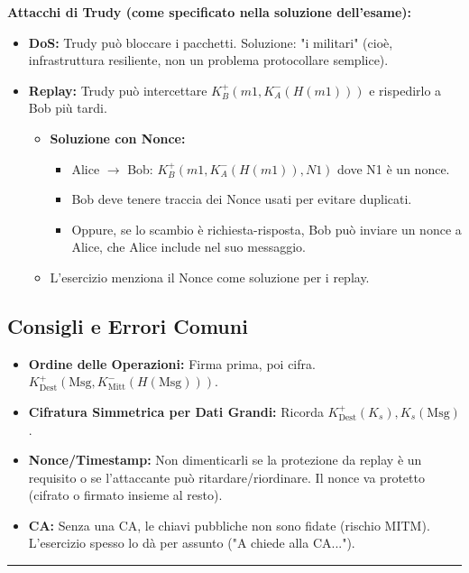 \textbf{Attacchi di Trudy (come specificato nella soluzione dell'esame):}
\begin{itemize}
    \item \textbf{DoS:} Trudy può bloccare i pacchetti. Soluzione: "i militari" (cioè, infrastruttura resiliente, non un problema protocollare semplice).
    \item \textbf{Replay:} Trudy può intercettare $K_B^+(m1, K_A^-(H(m1)))$ e rispedirlo a Bob più tardi.
    \begin{itemize}
        \item \textbf{Soluzione con Nonce:}
            \begin{itemize}
                \item Alice $\to$ Bob: $K_B^+(m1, K_A^-(H(m1)), N1)$ dove N1 è un nonce.
                \item Bob deve tenere traccia dei Nonce usati per evitare duplicati.
                \item Oppure, se lo scambio è richiesta-risposta, Bob può inviare un nonce a Alice, che Alice include nel suo messaggio.
            \end{itemize}
        \item L'esercizio menziona il Nonce come soluzione per i replay.
    \end{itemize}
\end{itemize}

\subsection{Consigli e Errori Comuni}
\begin{itemize}
    \item \textbf{Ordine delle Operazioni:} Firma prima, poi cifra. $K_{\text{Dest}}^+(\text{Msg}, K_{\text{Mitt}}^-(H(\text{Msg})))$.
    \item \textbf{Cifratura Simmetrica per Dati Grandi:} Ricorda $K_{\text{Dest}}^+(K_s), K_s(\text{Msg})$.
    \item \textbf{Nonce/Timestamp:} Non dimenticarli se la protezione da replay è un requisito o se l'attaccante può ritardare/riordinare. Il nonce va protetto (cifrato o firmato insieme al resto).
    \item \textbf{CA:} Senza una CA, le chiavi pubbliche non sono fidate (rischio MITM). L'esercizio spesso lo dà per assunto ("A chiede alla CA...").
\end{itemize}

\hrule %

